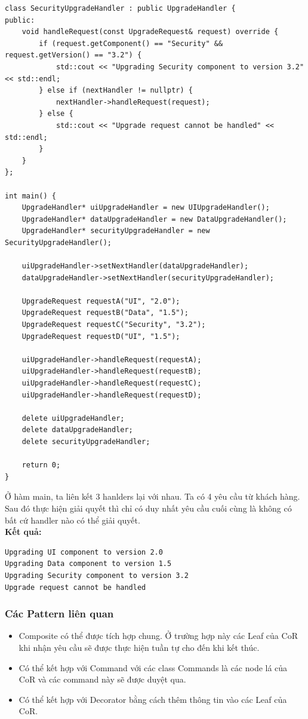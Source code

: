 \begin{lstlisting}
class SecurityUpgradeHandler : public UpgradeHandler {
public:
    void handleRequest(const UpgradeRequest& request) override {
        if (request.getComponent() == "Security" && request.getVersion() == "3.2") {
            std::cout << "Upgrading Security component to version 3.2" << std::endl;
        } else if (nextHandler != nullptr) {
            nextHandler->handleRequest(request);
        } else {
            std::cout << "Upgrade request cannot be handled" << std::endl;
        }
    }
};

int main() {
    UpgradeHandler* uiUpgradeHandler = new UIUpgradeHandler();
    UpgradeHandler* dataUpgradeHandler = new DataUpgradeHandler();
    UpgradeHandler* securityUpgradeHandler = new SecurityUpgradeHandler();

    uiUpgradeHandler->setNextHandler(dataUpgradeHandler);
    dataUpgradeHandler->setNextHandler(securityUpgradeHandler);

    UpgradeRequest requestA("UI", "2.0");
    UpgradeRequest requestB("Data", "1.5");
    UpgradeRequest requestC("Security", "3.2");
    UpgradeRequest requestD("UI", "1.5");

    uiUpgradeHandler->handleRequest(requestA);
    uiUpgradeHandler->handleRequest(requestB);
    uiUpgradeHandler->handleRequest(requestC);
    uiUpgradeHandler->handleRequest(requestD);

    delete uiUpgradeHandler;
    delete dataUpgradeHandler;
    delete securityUpgradeHandler;

    return 0;
}

\end{lstlisting}
Ở hàm main, ta liên kết 3 hanlders lại với nhau. Ta có 4 yêu cầu từ khách hàng. Sau đó thực hiện giải quyết thì chỉ có duy nhất yêu cầu cuối cùng là không có bất cứ handler nào có thể giải quyết.\\
\newline
\textbf{Kết quả:}
\begin{lstlisting}
Upgrading UI component to version 2.0
Upgrading Data component to version 1.5
Upgrading Security component to version 3.2
Upgrade request cannot be handled
\end{lstlisting}
\subsubsection{Các Pattern liên quan}
\begin{itemize}
    \item Composite có thể được tích hợp chung. Ở trường hợp này các Leaf của CoR khi nhận yêu cầu sẽ được thực hiện tuần tự cho đến khi kết thúc.
    \item Có thể kết hợp với Command với các class Commands là các node lá của CoR và các command này sẽ được duyệt qua.
    \item Có thể kết hợp với Decorator bằng cách thêm thông tin vào các Leaf của CoR.
\end{itemize}
